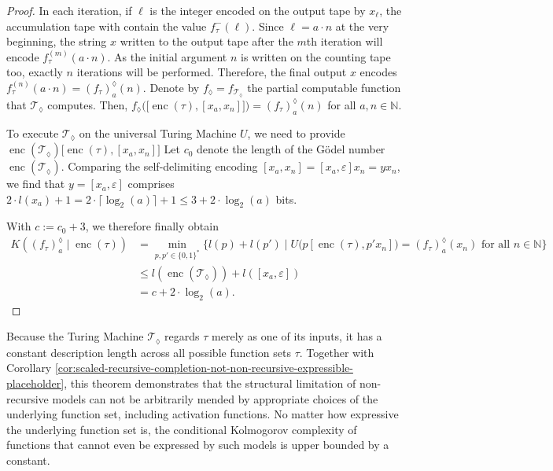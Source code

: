 \begin{proof}
	In each iteration, if $\ell$ is the integer encoded on the output tape by $x_\ell$, the accumulation tape with contain the value $f_{\tau}^{-}(\ell)$.
	Since $\ell=a\cdot n$ at the very beginning, the string $x$ written to the output tape after the $m$th iteration will encode $f_{\tau}^{(m)}(a\cdot n)$.
	As the initial argument $n$ is written on the counting tape too, exactly $n$ iterations will be performed.
	Therefore, the final output $x$ encodes $f_{\tau}^{(n)}(a\cdot n)=\left(f_{\tau}\right)_a^{\lozenge}(n)$. 
	Denote by $f_{\lozenge}=f_{\mathcal{T}_{\lozenge}}$ the partial computable function that $\mathcal{T}_{\lozenge}$ computes. Then, $f_{\lozenge}\bigl(\bigl[\operatorname{enc}(\tau),[x_a,x_n]\bigr]\bigr)=\left(f_{\tau}\right)_a^{\lozenge}(n)$ for all $a,n\in\mathbb{N}$.
	
	To execute $\mathcal{T}_{\lozenge}$ on the universal Turing Machine $U$,
	we need to provide $\operatorname{enc}(\mathcal{T}_{\lozenge})\bigl[\operatorname{enc}(\tau),[x_a,x_n]\bigr]$
	Let $c_0$ denote the length of the G\"odel number $\operatorname{enc}(\mathcal{T}_{\lozenge})$.
	Comparing the self-delimiting encoding $[x_a,x_n]=[x_a,\varepsilon]x_n=yx_n$, we find that $y=[x_a,\varepsilon]$ comprises $2\cdot l(x_a)+1 = 2\cdot \lceil \log_2(a)\rceil +1 \leq 3 + 2\cdot \log_2(a)$ bits.
	
	With $c:=c_0+3$, we therefore finally obtain
	\begin{align}
		K(\left(f_{\tau}\right)_{a}^{\lozenge}\mid \operatorname{enc}(\tau))
		&= \min_{p,p'\in\{0,1\}^{*}}\{l(p)+l(p')\mid U\bigl(p[\operatorname{enc}(\tau),p'x_n]\bigr)=\left(f_{\tau}\right)_{a}^{\lozenge}(x_n) \text{ for all } n\in\mathbb{N}\}\\
		& \leq l(\operatorname{enc}(\mathcal{T}_{\lozenge})) + l([x_a,\varepsilon])\\
		& = c + 2\cdot \log_2(a).
	\end{align}
\end{proof}

Because the Turing Machine $\mathcal{T}_{\lozenge}$ regards $\tau$ merely as one of its inputs, it has a constant description length across all possible function sets $\tau$.
Together with Corollary \ref{cor:scaled-recursive-completion-not-non-recursive-expressible-placeholder}, this theorem demonstrates that the structural limitation of non-recursive models can not be arbitrarily mended by appropriate choices of the underlying function set, including activation functions.
No matter how expressive the underlying function set is, the conditional Kolmogorov complexity of functions that cannot even be expressed by such models is upper bounded by a constant.

